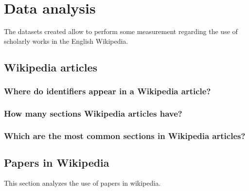 
\chapter{Data analysis}
\label{cha:data_analysis}
The datasets created allow to perform some measurement regarding the use of scholarly works in the English Wikipedia.

\section{Wikipedia articles}
\subsection{Where do identifiers appear in a Wikipedia article?}

\subsection{How many sections Wikipedia articles have?}

\subsection{Which are the most common sections in Wikipedia articles?}

\section{Papers in Wikipedia}
This section analyzes the use of papers in wikipedia.

